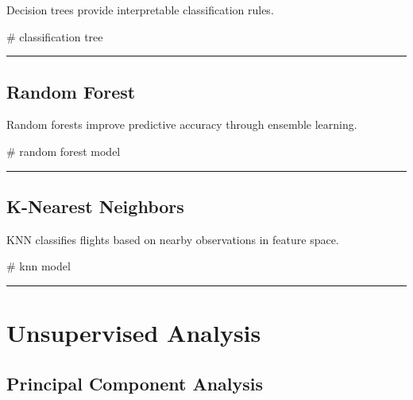 \documentclass[
  letterpaper,
  DIV=11,
  numbers=noendperiod]{scrartcl}
\newenvironment{Shaded}{\begin{snugshade}}{\end{snugshade}}
\newcommand{\CommentTok}[1]{\textcolor[rgb]{0.37,0.37,0.37}{#1}}
\begin{document}
Decision trees provide interpretable classification rules.

\begin{Shaded}
\begin{Highlighting}[]
\CommentTok{\# classification tree}
\end{Highlighting}
\end{Shaded}

\begin{center}\rule{0.5\linewidth}{0.5pt}\end{center}

\subsection{Random Forest}\label{random-forest}

Random forests improve predictive accuracy through ensemble learning.

\begin{Shaded}
\begin{Highlighting}[]
\CommentTok{\# random forest model}
\end{Highlighting}
\end{Shaded}

\begin{center}\rule{0.5\linewidth}{0.5pt}\end{center}

\subsection{K-Nearest Neighbors}\label{k-nearest-neighbors}

KNN classifies flights based on nearby observations in feature space.

\begin{Shaded}
\begin{Highlighting}[]
\CommentTok{\# knn model}
\end{Highlighting}
\end{Shaded}

\begin{center}\rule{0.5\linewidth}{0.5pt}\end{center}

\section{Unsupervised Analysis}\label{unsupervised-analysis}

\subsection{Principal Component
Analysis}\label{principal-component-analysis}
\end{document}
